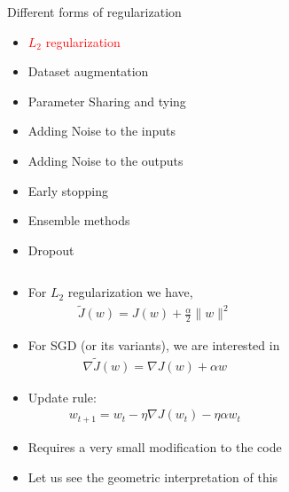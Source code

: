 \begin{frame}
\end{frame}

\begin{frame}
	\vspace{4em}
	\begin{overlayarea}{\textwidth}{\textheight}
		\begin{block}{Different forms of regularization}
			\begin{itemize}
				\item \textcolor{red}{$L_2$ regularization}
				\item Dataset augmentation
				\item Parameter Sharing and tying
				\item Adding Noise to the inputs 
				\item Adding Noise to the outputs
				\item Early stopping
				\item Ensemble methods
				\item Dropout
			\end{itemize}
		\end{block}
	\end{overlayarea}
\end{frame}

	
\begin{frame}
	\begin{columns}
		\column{\textwidth}
		\vspace{2em}
		\begin{overlayarea}{\textwidth}{\textheight}
			\begin{itemize}
				\item<1-> For $L_2$ regularization we have,
				\begin{align*} 
					\widetilde{J}(w) = J(w) + \frac{\alpha}{2} \|w\|^2
				\end{align*}
				\item<2-> For SGD (or its variants), we are interested in
				\begin{align*}
					\nabla \widetilde{J}(w) =  \nabla J(w) + \alpha w
				\end{align*}
				\item<3-> Update rule:
				\begin{align*}
				w_{t+1} = w_t - \eta \nabla J(w_t) - \eta \alpha w_t
				\end{align*}
				\item<4-> Requires a very small modification to the code
									
				\item<5-> Let us see the geometric interpretation of this
			\end{itemize}
		\end{overlayarea}
	\end{columns}
\end{frame}
	
